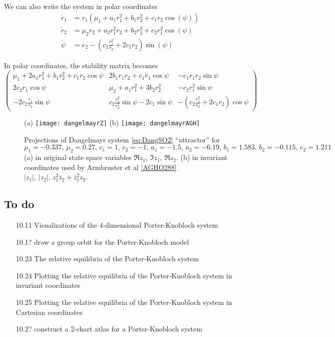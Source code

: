 \documentclass{article}
\begin{document}
We can also write the system in polar coordinates
\begin{align}
\dot{r}_1&=r_1(\mu_1+a_1r_1^2+b_1r_2^2+c_1r_2\cos(\psi))\\
\dot{r}_2&=\mu_2r_2+a_2r_1^2r_2+b_2r_2^3+c_2r_1^2\cos(\psi)\\
\dot{\psi}&=e_2-(c_2\frac{r_1^2}{r_2}+2c_1r_2)\sin(\psi)
\end{align}

In polar coordinates, the stability matrix becomes
\begin{equation}
\left(\begin{array}{ccc}
\mu_1+2a_1r_1^2+b_1r_2^2+c_1r_2\cos\psi & 2b_1r_1r_2+c_1r_1\cos\psi & -c_1r_1r_2\sin\psi\\
2c_2r_1\cos\psi & \mu_2+a_1r_1^2+3b_2r_2^2 & -c_2r_1^2\sin\psi\\
-2c_2\frac{r_1}{r_2}\sin\psi & c_2\frac{r_1^2}{r_2^2}\sin\psi-2c_1\sin\psi & -(c_2\frac{r_1^2}{r_2}+2c_1r_2)\cos\psi
\end{array}\right)
\end{equation}


\begin{figure}
\centering
 (a) \texttt{[image: dangelmayrZ]}
 (b) \texttt{[image: dangelmayrAGH]}
\caption{Projections of Dangelmayr system \ref{eq:DangSO2}
``attractor'' for $\mu_1 = -0.337,\, \mu_2 = 0.27,\, c_1 = 1,\, c_2 =
-1,\, a_1 = -1.5,\, a_2 = -6.19,\, b_1 = 1.583,\,  b_2 = -0.115,\, e_2 =
1.211$
(a) in original state space variables $\Re z_1,\,\Im z_1,\,\Re z_2$.
(b) in invariant coordinates used by
Armbruster et al \ref{AGHO288} $|z_1|,\, |z_2|,\, z_1^2 \bar{z}_2 + \bar{z}_1^2 z_2$.
}
 \label{fig:dangelmayrChaos}
\end{figure}

\subsection{To do}
\label{s:ToDo}

\begin{itemize}

  \item[10.11] Visualizations of the 4-dimensional Porter-Knobloch system
  \item[10.1?] draw a group orbit for the Porter-Knobloch model
  \item[10.23] The relative equilibria of the Porter-Knobloch system
  \item[10.24] Plotting the relative equilibria of
           the Porter-Knobloch system in invariant coordinates
  \item[10.25] Plotting the relative equilibria of
           the Porter-Knobloch system in Cartesian coordinates
  \item[10.2?] construct a 2-chart atlas for a Porter-Knobloch system
\end{itemize}
\end{document}

